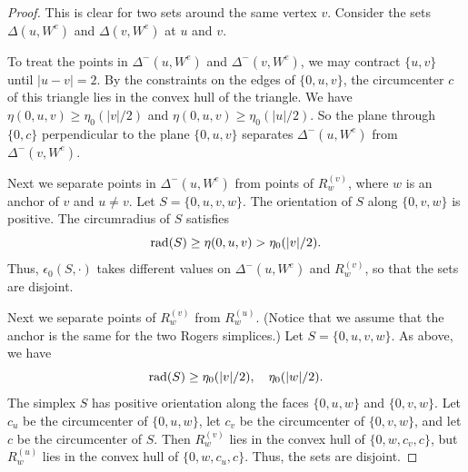 \begin{proof}
This is clear for two sets around the same vertex $v$.  Consider
the sets $\Delta(u,W^e)$ and $\Delta(v,W^e)$ at $u$ and $v$.

To treat the points in $\Delta^-(u,W^e)$ and $\Delta^-(v,W^e)$, we
may contract $\{u,v\}$ until $|u-v|=2$.  By the constraints on the
edges of $\{0,u,v\}$, the circumcenter $c$ of this triangle lies
in the convex hull of the triangle.  We have $\eta(0,u,v)\ge
\eta_0(|v|/2)$ and $\eta(0,u,v)\ge\eta_0(|u|/2)$.  So the plane
through $\{0,c\}$ perpendicular to the plane $\{0,u,v\}$ separates
$\Delta^-(u,W^e)$ from $\Delta^-(v,W^e)$.

Next we separate points in $\Delta^-(u,W^e)$ from points of
$R_w^{(v)}$, where $w$ is an anchor of $v$ and $u\ne v$.  Let
$S=\{0,u,v,w\}$. The orientation of $S$ along $\{0,v,w\}$ is
positive.  The circumradius of $S$ satisfies
    $$
    \operatorname{rad}(S) \ge \eta(0,u,v)>\eta_0(|v|/2).
    $$
Thus, $\epsilon_0(S,\cdot)$ takes different values on
$\Delta^-(u,W^e)$ and $R_w^{(v)}$, so that the sets are disjoint.

Next we separate points of $R_w^{(v)}$ from $R_w^{(u)}$.  (Notice
that we assume that the anchor is the same for the two Rogers
simplices.) Let $S=\{0,u,v,w\}$.   As above, we have
    $$
    \operatorname{rad}(S) \ge \eta_0(|v|/2), \quad \eta_0(|w|/2).
    $$
The simplex $S$ has positive orientation along the faces
$\{0,u,w\}$ and $\{0,v,w\}$.  Let $c_u$ be the circumcenter of
$\{0,u,w\}$, let $c_v$ be the circumcenter of $\{0,v,w\}$, and let
$c$ be the circumcenter of $S$.  Then $R_w^{(v)}$ lies in the
convex hull of $\{0,w,c_v,c\}$, but $R_w^{(u)}$ lies in the convex
hull of $\{0,w,c_u,c\}$.  Thus, the sets are disjoint.


\end{proof}
